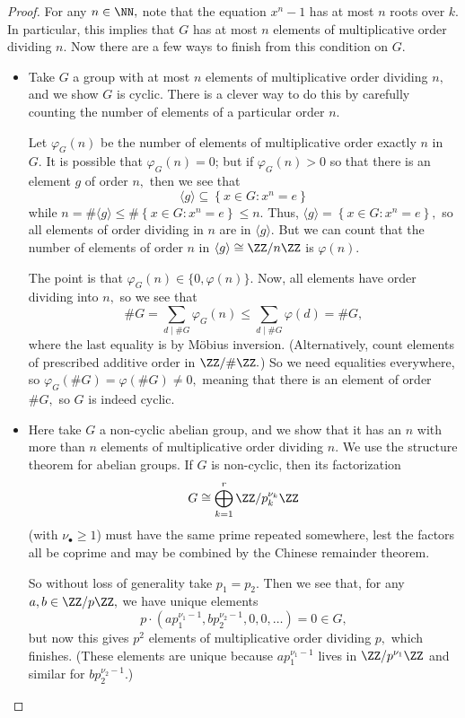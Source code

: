 \documentclass[../notes.tex]{subfiles}
\begin{document}
\begin{proof}
	For any $n\in\NN,$ note that the equation $x^n-1$ has at most $n$ roots over $k.$ In particular, this implies that $G$ has at most $n$ elements of multiplicative order dividing $n.$ Now there are a few ways to finish from this condition on $G.$
	\begin{itemize}
		\item Take $G$ a group with at most $n$ elements of multiplicative order dividing $n,$ and we show $G$ is cyclic. There is a clever way to do this by carefully counting the number of elements of a particular order $n.$
		
		Let $\varphi_G(n)$ be the number of elements of multiplicative order exactly $n$ in $G.$ It is possible that $\varphi_G(n)=0$; but if $\varphi_G(n)>0$ so that there is an element $g$ of order $n,$ then we see that
		\[\langle g\rangle\subseteq\left\{x\in G:x^n=e\right\}\]
		while $n=\#\langle g\rangle\le\#\left\{x\in G:x^n=e\right\}\le n.$ Thus, $\langle g\rangle=\left\{x\in G:x^n=e\right\},$ so all elements of order dividing in $n$ are in $\langle g\rangle.$ But we can count that the number of elements of order $n$ in $\langle g\rangle\cong\ZZ/n\ZZ$ is $\varphi(n).$

		The point is that $\varphi_G(n)\in\{0,\varphi(n)\}.$ Now, all elements have order dividing into $n,$ so we see that
		\[\#G=\sum_{d\mid\#G}\varphi_G(n)\le\sum_{d\mid\#G}\varphi(d)=\#G,\]
		where the last equality is by M\"obius inversion. (Alternatively, count elements of prescribed additive order in $\ZZ/\#\ZZ.$) So we need equalities everywhere, so $\varphi_G(\#G)=\varphi(\#G)\ne0,$ meaning that there is an element of order $\#G,$ so $G$ is indeed cyclic.

		\item Here take $G$ a non-cyclic abelian group, and we show that it has an $n$ with more than $n$ elements of multiplicative order dividing $n.$ We use the structure theorem for abelian groups. If $G$ is non-cyclic, then its factorization
		\[G\cong\bigoplus_{k=1}^r\ZZ/p_k^{\nu_k}\ZZ\]
		(with $\nu_\bullet\ge1$) must have the same prime repeated somewhere, lest the factors all be coprime and may be combined by the Chinese remainder theorem.
		
		So without loss of generality take $p_1=p_2.$ Then we see that, for any $a,b\in\ZZ/p\ZZ,$ we have unique elements
		\[p\cdot\left(ap_1^{\nu_1-1},bp_2^{\nu_2-1},0,0,\ldots\right)=0\in G,\]
		but now this gives $p^2$ elements of multiplicative order dividing $p,$ which finishes. (These elements are unique because $ap_1^{\nu_1-1}$ lives in $\ZZ/p^{\nu_1}\ZZ$ and similar for $bp_2^{\nu_2-1}.$)
		\qedhere
	\end{itemize}
\end{proof}
\end{document}
